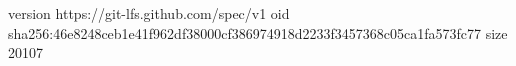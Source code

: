 version https://git-lfs.github.com/spec/v1
oid sha256:46e8248ceb1e41f962df38000cf386974918d2233f3457368c05ca1fa573fc77
size 20107
